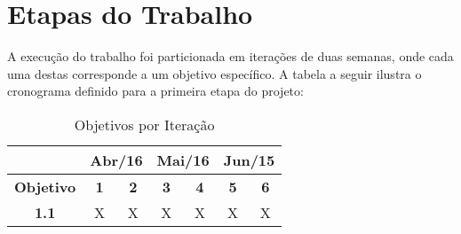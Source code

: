 \chapter{\label{chap:work-plan}Etapas do Trabalho}

A execução do trabalho foi particionada em iterações de duas semanas, onde cada
uma destas corresponde a um objetivo específico. A tabela a seguir ilustra o
cronograma definido para a primeira etapa do projeto:



\begin{table}[htb!]
\centering
\caption{Objetivos por Iteração}
\label{tab:work-plan}
\begin{tabular}{c|c|c|c|c|c|c|}
\cline{2-7}
{\bf}                                 & \multicolumn{2}{c|}{{\bf Abr/16}}             & \multicolumn{2}{c|}{{\bf Mai/16}}             & \multicolumn{2}{c|}{{\bf Jun/15}} \\ \hline
\multicolumn{1}{|c|}{{\bf Objetivo}}  & {\bf 1}               & {\bf 2}               & {\bf 3}               & {\bf 4}               & {\bf 5}               & {\bf 6}   \\ \hline
\multicolumn{1}{|c|}{{\bf 1.1}}       & X                     & X                     & X                     & X                     & X                     & X   \\ \hline
\end{tabular}
\end{table}
